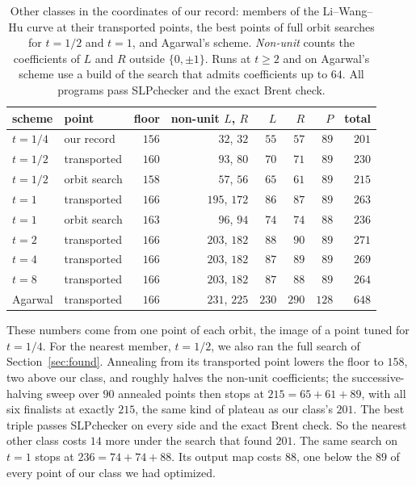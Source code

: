 \documentclass[11pt]{article}
\theoremstyle{remark}
\begin{document}
\begin{table}[ht]
\centering
\caption{Other classes in the coordinates of our record: members of the
Li--Wang--Hu curve at their transported points, the best points of full
orbit searches for $t=1/2$ and $t=1$, and Agarwal's scheme.
\emph{Non-unit} counts the coefficients of $L$ and $R$ outside
$\{0,\pm1\}$.  Runs at $t\ge2$ and on Agarwal's scheme use a build of the
search that admits coefficients up to $64$.  All programs pass
SLPchecker and the exact Brent check.}\label{tab:classes}
\small
\begin{tabular}{llrrrrrr}
\toprule
scheme & point & floor & non-unit $L$, $R$ & $L$ & $R$ & $P$ & total \\
\midrule
$t=1/4$ & our record & $156$ & $32$, $32$ & $55$ & $57$ & $89$ & $201$ \\
$t=1/2$ & transported & $160$ & $93$, $80$ & $70$ & $71$ & $89$ & $230$ \\
$t=1/2$ & orbit search & $158$ & $57$, $56$ & $65$ & $61$ & $89$ & $215$ \\
$t=1$ & transported & $166$ & $195$, $172$ & $86$ & $87$ & $89$ & $263$ \\
$t=1$ & orbit search & $163$ & $96$, $94$ & $74$ & $74$ & $88$ & $236$ \\
$t=2$ & transported & $166$ & $203$, $182$ & $88$ & $90$ & $89$ & $271$ \\
$t=4$ & transported & $166$ & $203$, $182$ & $87$ & $89$ & $89$ & $269$ \\
$t=8$ & transported & $166$ & $203$, $182$ & $87$ & $88$ & $89$ & $264$ \\
Agarwal & transported & $166$ & $231$, $225$ & $230$ & $290$ & $128$ & $648$ \\
\bottomrule
\end{tabular}
\end{table}

These numbers come from one point of each orbit, the image of a point
tuned for $t=1/4$.  For the nearest member, $t=1/2$, we also ran the full
search of Section~\ref{sec:found}.  Annealing from its transported point
lowers the floor to $158$, two above our class, and roughly halves the
non-unit coefficients; the successive-halving sweep over $90$ annealed
points then stops at $215=65+61+89$, with all six finalists at exactly
$215$, the same kind of plateau as our class's $201$.  The best triple
passes SLPchecker on every side and the exact Brent check.  So the
nearest other class costs $14$ more under the search that found $201$.
The same search on $t=1$ stops at $236=74+74+88$.  Its output map
costs $88$, one below the $89$ of every point of our class we had
optimized.
\end{document}
